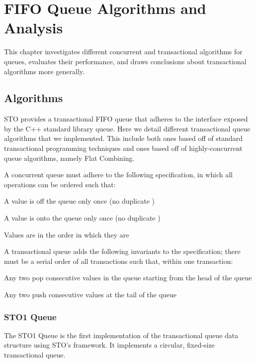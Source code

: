 \section{FIFO Queue Algorithms and Analysis}

This chapter investigates different concurrent and transactional algorithms for queues, evaluates their performance, and draws conclusions about transactional algorithms more generally.


\subsection{Algorithms}

STO provides a transactional FIFO queue that adheres to the interface exposed by the C++ standard library queue. Here we detail different transactional queue algorithms that we implemented. This include both ones based off of standard transactional programming techniques and ones based off of highly-concurrent queue algorithms, namely Flat Combining.

A concurrent queue must adhere to the following specification, in which all operations can be ordered such that:
\begin{bullets}
    \item A value is \popped off the queue only once (no duplicate \pops)
    \item A value is \pushed onto the queue only once (no duplicate \pushes)
    \item Values are \popped in the order in which they are \pushed
\end{bullets}

A transactional queue adds the following invariants to the specification; there must be a serial order of all transactions such that, within one transaction:
\begin{bullets}
    \item Any two \pops pop consecutive values in the queue starting from the head of the queue 
    \item Any two \pushes push consecutive values at the tail of the queue
\end{bullets}

\subsubsection{STO1 Queue}
The STO1 Queue is the first implementation of the transactional queue data structure using STO’s framework. It implements a circular, fixed-size transactional queue.

